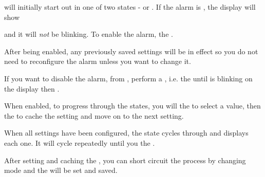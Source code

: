  will initially start out in one of two states -  or .
If the alarm is , the display will show

\begin{figure}[H]
\centering
\end{figure}

and it will \textit{not} be blinking.  To enable the alarm,  the .


After being enabled, any previously saved settings will be in effect so you
do not need to reconfigure the alarm unless you want to change it.

\par\medskip

If you want to disable the alarm, from , perform a , i.e.
 the  until \symD{<<<<} is blinking on the display then .



\par\medskip

When enabled, to progress through the states, you will  the
 to select a value, then  the  to cache the setting and
move on to the next setting.

\tabcolsep=8pt
\tabcolsep=12pt

When all settings have been configured, the  state cycles through and
displays each one.  It will cycle repeatedly until you  the .

\par\medskip

After setting and caching the , you can short circuit the process by
changing mode and the  will be set and saved.

\tabcolsep=10pt
\tabcolsep=12pt

